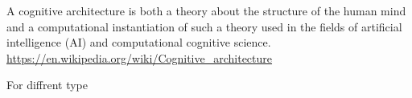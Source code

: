 \documentclass[a4paper]{article}
\title{}
\date{}
\begin{document}
    \maketitle
    A cognitive architecture is both a theory about the structure of the human mind and a computational instantiation of such a theory used in the fields of artificial intelligence (AI) and computational cognitive science. \url{https://en.wikipedia.org/wiki/Cognitive_architecture}
    
    For diffrent type \
\end{document}

